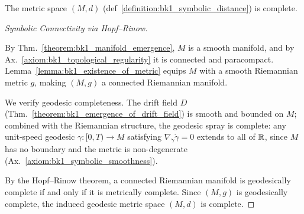 \begin{lemma}
\label{lemma:bk1_completeness_of_symbolic_distance}
The metric space $(M, d)$ (def~\ref{definition:bk1_symbolic_distance}) is complete.
\begin{proof}[Symbolic Connectivity via Hopf--Rinow]
\label{proof:bk1_sketch_symbolic_connectivity}
\leavevmode

By Thm.~\ref{theorem:bk1_manifold_emergence}, $M$ is a smooth manifold, and by
Ax.~\ref{axiom:bk1_topological_regularity} it is connected and paracompact.
Lemma~\ref{lemma:bk1_existence_of_metric} equips $M$ with a smooth Riemannian metric $g$,
making $(M,g)$ a connected Riemannian manifold.

We verify geodesic completeness. The drift field $D$
(Thm.~\ref{theorem:bk1_emergence_of_drift_field}) is smooth and bounded on $M$; combined
with the Riemannian structure, the geodesic spray is complete: any unit-speed geodesic
$\gamma: [0,T) \to M$ satisfying $\nabla_{\dot\gamma}\dot\gamma = 0$ extends to all of
$\mathbb{R}$, since $M$ has no boundary and the metric is non-degenerate (Ax.~\ref{axiom:bk1_symbolic_smoothness}).

By the Hopf--Rinow theorem, a connected Riemannian manifold is geodesically complete if
and only if it is metrically complete. Since $(M,g)$ is geodesically complete, the induced
geodesic metric space $(M,d)$ is complete.
\end{proof}
\end{lemma}
